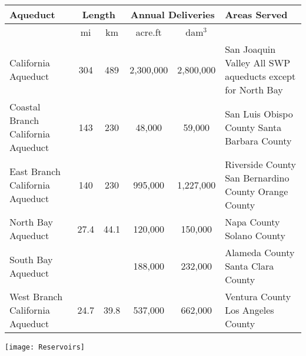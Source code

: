 \documentclass{article}
\begin{document}
\begin{table}[!ht]
\renewcommand{\arraystretch}{2}
    \centering
    \begin{tabular}{|l|c|c|c|c|p{3cm}|}
    \hline
    \textbf{Aqueduct} & \multicolumn{2}{c|}{\textbf{Length}}& \multicolumn{2}{c|}{\textbf{Annual Deliveries}} &\textbf{Areas Served}\\
    \hline
         & mi & km & acre.ft & dam$^3$ & \\ \hline
       
       
        California Aqueduct & 304 & 489 & 2,300,000 & 2,800,000 & San Joaquin Valley All SWP aqueducts except for North Bay\\ \hline
        Coastal Branch California Aqueduct & 143 & 230 & 48,000 & 59,000 & San Luis Obispo County Santa Barbara County\\ \hline
        East Branch California Aqueduct & 140 & 230 & 995,000 & 1,227,000 & Riverside County San Bernardino County Orange County \\ \hline
        
        North Bay Aqueduct & 27.4 & 44.1 & 120,000 & 150,000 & Napa County
Solano County \\ \hline
South Bay Aqueduct & & & 188,000 & 232,000 & Alameda County
Santa Clara County \\ \hline
West Branch California Aqueduct & 24.7 & 39.8 & 537,000 & 662,000 & Ventura County
Los Angeles County \\ \hline
    \end{tabular}
\end{table}
\pagebreak
\begin{center}
\texttt{[image: Reservoirs]}
\end{center}
\end{document}
